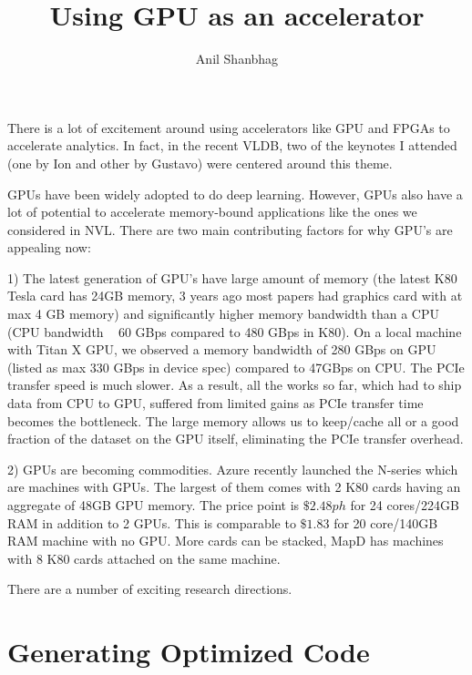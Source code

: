 \documentclass[11pt,twoside,a4paper]{article}
\begin{document}
\title{Using GPU as an accelerator}
\author{Anil Shanbhag}
\maketitle

There is a lot of excitement around using accelerators like GPU and FPGAs to
accelerate analytics. In fact, in the recent VLDB, two of the keynotes I
attended  (one by Ion and other by Gustavo) were centered around this theme. 

GPUs have been widely adopted to do deep learning. However, GPUs also have a lot of
potential to accelerate memory-bound applications like the ones we considered in
NVL. There are two main contributing factors for why GPU's are appealing now:

1) The latest generation of GPU's have large amount of memory (the latest K80
Tesla card has 24GB memory, 3 years ago most papers had graphics card with at
max 4 GB memory) and significantly higher memory bandwidth than a CPU (CPU
bandwidth ~ 60 GBps compared to 480 GBps in K80). On a local machine with Titan
X GPU, we observed a memory bandwidth of 280 GBps on GPU (listed as max 330 GBps
in device spec) compared to 47GBps on CPU. The PCIe transfer speed is much
slower. As a result, all the works so far, which had to ship data from CPU to
GPU, suffered from limited gains as PCIe transfer time becomes the bottleneck.
The large memory allows us to keep/cache all or a good fraction of the dataset
on the GPU itself, eliminating the PCIe transfer overhead. 

2) GPUs are becoming commodities. Azure recently launched the N-series which are
machines with GPUs. The largest of them comes with 2 K80 cards having an
aggregate of 48GB GPU memory. The price point is $\$2.48ph$ for 24 cores/224GB
RAM in addition to 2 GPUs. This is comparable to $\$1.83$ for 20 core/140GB RAM
machine with no GPU. More cards can be stacked, MapD has machines with 8 K80
cards attached on the same machine. 

There are a number of exciting research directions. 

\section{Generating Optimized Code}
\end{document}
